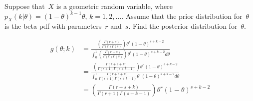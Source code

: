 \begin{problem}
  Suppose that~$X$ is a geometric random variable, where ${p_{X}(k\vert\theta) = (1-\theta)^{k-1}\theta\text{,  }k=1,2,\ldots}$. Assume that the prior distribution for~$\theta$ is the beta pdf with parameters~$r$ and~$s$.  Find the posterior distribution for~$\theta$.
\end{problem}

\begin{align}
  g(\theta;k) &= \frac{\left(\frac{\Gamma(r+s)}{\Gamma(r)\Gamma(s)}\right) \theta^{r} (1 - \theta)^{s+k-2}}{\int_{0}^{1} \left(\frac{\Gamma(r+s)}{\Gamma(r)\Gamma(s)}\right) \theta^{r} (1 - \theta)^{s+k-2} d\theta} \\
              &= \frac{\left(\frac{\Gamma(r+s+k)}{\Gamma(r+1)\Gamma(s+k-1)}\right) \theta^{r} (1 - \theta)^{s+k-2}}{\int_{0}^{1} \frac{\Gamma(r+s+k)}{\Gamma(r+1)\Gamma(s+k-1)} \theta^{r} (1 - \theta)^{s+k-2} d\theta} \\
              &= \left(\frac{\Gamma(r+s+k)}{\Gamma(r+1)\Gamma(s+k-1)}\right) \theta^{r} (1 - \theta)^{s+k-2}
\end{align}

